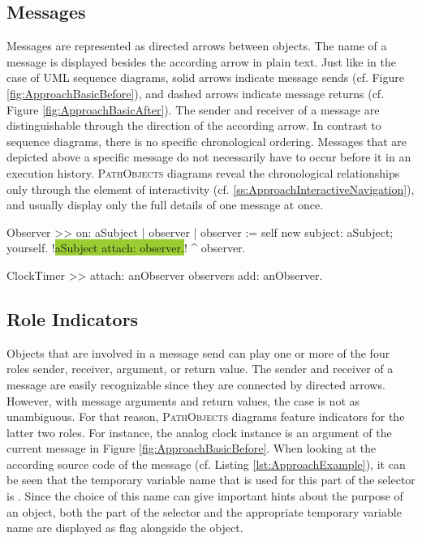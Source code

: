 \subsection{Messages}
\label{ss:ApproachNotationMessages}
Messages are represented as directed arrows between objects.
The name of a message is displayed besides the according arrow in plain text.
Just like in the case of UML sequence diagrams, solid arrows indicate message sends (cf. Figure \ref{fig:ApproachBasicBefore}), and dashed arrows indicate message returns (cf. Figure \ref{fig:ApproachBasicAfter}).
The sender and receiver of a message are distinguishable through the direction of the according arrow.
In contrast to sequence diagrams, there is no specific chronological ordering.
Messages that are depicted above a specific message do not necessarily have to occur before it in an execution history.
\textsc{PathObjects} diagrams reveal the chronological relationships only through the element of interactivity (cf. \ref{ss:ApproachInteractiveNavigation}), and usually display only the full details of one message at once.

\begin{smalltalk}[caption={Underlying implementation of the scenario depicted in Figure \ref{fig:ApproachBasic}. The current step of the execution is highlighted.}, label=lst:ApproachExample, escapechar=!]
Observer >> on: aSubject
	| observer |
	observer := self new
		subject: aSubject;
		yourself.
	!\colorbox{YellowGreen}{aSubject attach: observer.}!
	^ observer.

ClockTimer >> attach: anObserver
	observers add: anObserver.
\end{smalltalk}

\subsection{Role Indicators}
\label{ss:ApproachNotationRoles}
Objects that are involved in a message send can play one or more of the four roles sender, receiver, argument, or return value.
The sender and receiver of a message are easily recognizable since they are connected by directed arrows.
However, with message arguments and return values, the case is not as unambiguous.
For that reason, \textsc{PathObjects} diagrams feature indicators for the latter two roles.
For instance, the analog clock instance is an argument of the current message in Figure \ref{fig:ApproachBasicBefore}.
When looking at the according source code of the  message (cf. Listing \ref{lst:ApproachExample}), it can be seen that the temporary variable name that is used for this part of the selector is .
Since the choice of this name can give important hints about the purpose of an object,
both the part of the selector and the appropriate temporary variable name are displayed as flag alongside the object.

